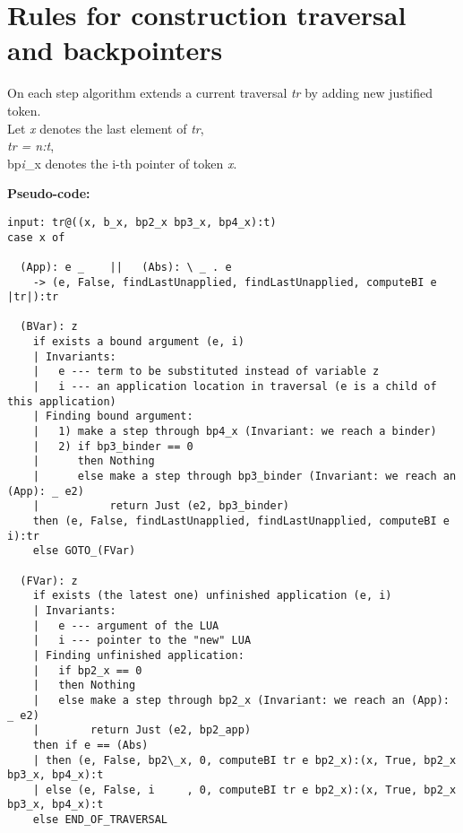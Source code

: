 \documentclass[a4paper, 12pt]{article} %
\begin{document}
\section*{Rules for construction traversal and backpointers}
On each step algorithm extends a current traversal \textit{tr} by adding new justified token.\\
Let \textit{x} denotes the last element of \textit{tr},\\
\textit{tr = n:t},\\
bp\textit{i}\_x denotes the i-th pointer of token \textit{x}.

\textbf{Pseudo-code:}
\begin{verbatim}
input: tr@((x, b_x, bp2_x bp3_x, bp4_x):t)
case x of
  
  (App): e _    ||   (Abs): \ _ . e
    -> (e, False, findLastUnapplied, findLastUnapplied, computeBI e |tr|):tr

  (BVar): z
    if exists a bound argument (e, i)
    | Invariants:
    |   e --- term to be substituted instead of variable z
    |   i --- an application location in traversal (e is a child of this application)
    | Finding bound argument:
    |   1) make a step through bp4_x (Invariant: we reach a binder)
    |   2) if bp3_binder == 0
    |      then Nothing
    |      else make a step through bp3_binder (Invariant: we reach an (App): _ e2)
    |           return Just (e2, bp3_binder)
    then (e, False, findLastUnapplied, findLastUnapplied, computeBI e i):tr
    else GOTO_(FVar)

  (FVar): z
    if exists (the latest one) unfinished application (e, i)
    | Invariants:
    |   e --- argument of the LUA
    |   i --- pointer to the "new" LUA
    | Finding unfinished application:
    |   if bp2_x == 0
    |   then Nothing
    |   else make a step through bp2_x (Invariant: we reach an (App): _ e2)
    |        return Just (e2, bp2_app)
    then if e == (Abs)
    | then (e, False, bp2\_x, 0, computeBI tr e bp2_x):(x, True, bp2_x bp3_x, bp4_x):t
    | else (e, False, i     , 0, computeBI tr e bp2_x):(x, True, bp2_x bp3_x, bp4_x):t
    else END_OF_TRAVERSAL
\end{verbatim}
\end{document}
